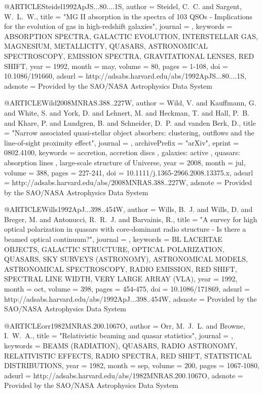 \documentclass[twocolumn]{aastex62}
\begin{document}
{{{{{{{{{{{{@ARTICLE{Steidel1992ApJS...80....1S,
   author = {{Steidel}, C.~C. and {Sargent}, W.~L.~W.},
    title = "{MG II absorption in the spectra of 103 QSOs - Implications for the evolution of gas in high-redshift galaxies}",
  journal = {\apjs},
 keywords = {ABSORPTION SPECTRA, GALACTIC EVOLUTION, INTERSTELLAR GAS, MAGNESIUM, METALLICITY, QUASARS, ASTRONOMICAL SPECTROSCOPY, EMISSION SPECTRA, GRAVITATIONAL LENSES, RED SHIFT},
     year = 1992,
    month = may,
   volume = 80,
    pages = {1-108},
      doi = {10.1086/191660},
   adsurl = {http://adsabs.harvard.edu/abs/1992ApJS...80....1S},
  adsnote = {Provided by the SAO/NASA Astrophysics Data System}
}



@ARTICLE{Wild2008MNRAS.388..227W,
   author = {{Wild}, V. and {Kauffmann}, G. and {White}, S. and {York}, D. and 
	{Lehnert}, M. and {Heckman}, T. and {Hall}, P.~B. and {Khare}, P. and 
	{Lundgren}, B. and {Schneider}, D.~P. and {vanden Berk}, D.},
    title = "{Narrow associated quasi-stellar object absorbers: clustering, outflows and the line-of-sight proximity effect}",
  journal = {\mnras},
archivePrefix = "arXiv",
   eprint = {0802.4100},
 keywords = {accretion, accretion discs , galaxies: active , quasars: absorption lines , large-scale structure of Universe},
     year = 2008,
    month = jul,
   volume = 388,
    pages = {227-241},
      doi = {10.1111/j.1365-2966.2008.13375.x},
   adsurl = {http://adsabs.harvard.edu/abs/2008MNRAS.388..227W},
  adsnote = {Provided by the SAO/NASA Astrophysics Data System}
}


@ARTICLE{Wills1992ApJ...398..454W,
   author = {{Wills}, B.~J. and {Wills}, D. and {Breger}, M. and {Antonucci}, R.~R.~J. and 
	{Barvainis}, R.},
    title = "{A survey for high optical polarization in quasars with core-dominant radio structure - Is there a beamed optical continuum?}",
  journal = {\apj},
 keywords = {BL LACERTAE OBJECTS, GALACTIC STRUCTURE, OPTICAL POLARIZATION, QUASARS, SKY SURVEYS (ASTRONOMY), ASTRONOMICAL MODELS, ASTRONOMICAL SPECTROSCOPY, RADIO EMISSION, RED SHIFT, SPECTRAL LINE WIDTH, VERY LARGE ARRAY (VLA)},
     year = 1992,
    month = oct,
   volume = 398,
    pages = {454-475},
      doi = {10.1086/171869},
   adsurl = {http://adsabs.harvard.edu/abs/1992ApJ...398..454W},
  adsnote = {Provided by the SAO/NASA Astrophysics Data System}
}


@ARTICLE{orr1982MNRAS.200.1067O,
   author = {{Orr}, M.~J.~L. and {Browne}, I.~W.~A.},
    title = "{Relativistic beaming and quasar statistics}",
  journal = {\mnras},
 keywords = {BEAMS (RADIATION), QUASARS, RADIO ASTRONOMY, RELATIVISTIC EFFECTS, RADIO SPECTRA, RED SHIFT, STATISTICAL DISTRIBUTIONS},
     year = 1982,
    month = sep,
   volume = 200,
    pages = {1067-1080},
   adsurl = {http://adsabs.harvard.edu/abs/1982MNRAS.200.1067O},
  adsnote = {Provided by the SAO/NASA Astrophysics Data System}
}


}}}}}}}}}}}}
\end{document}
